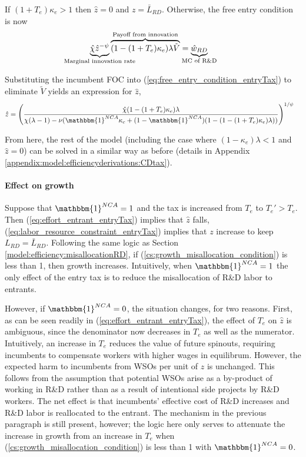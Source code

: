 \documentclass[11pt,english]{article}
\theoremstyle{definition}
\begin{document}
If $(1 + T_e) \kappa_e > 1$ then $\hat{z} = 0$ and $z = \bar{L}_{RD}$. Otherwise, the free entry condition is now
\begin{align}
\underbrace{\hat{\chi} \hat{z}^{-\psi}}_{\mathclap{\text{Marginal innovation rate}}} \overbrace{(1-(1+T_e)\kappa_e) \lambda \tilde{V}}^{\mathclap{\text{Payoff from innovation}}} &= \underbrace{\hat{w}_{RD}}_{\mathclap{\text{MC of R\&D}}} \label{eq:free_entry_condition_entryTax}
\end{align}

Substituting the incumbent FOC into (\ref{eq:free_entry_condition_entryTax}) to eliminate $\tilde{V}$ yields an expression for $\hat{z}$, 
\begin{align}
\hat{z} &= \Bigg( \frac{\hat{\chi} (1-(1+T_e)\kappa_{e}) \lambda}{\chi(\lambda -1) - \nu (\mathbbm{1}^{NCA}\kappa_c + (1-\mathbbm{1}^{NCA})(1 - (1-(1+T_e)\kappa_e)\lambda)) } \Bigg)^{1/\psi} \label{eq:effort_entrant_entryTax}
\end{align}

From here, the rest of the model (including the case where $(1-\kappa_e)\lambda < 1$ and $\hat{z} = 0$) can be solved in a similar way as before (details in Appendix \ref{appendix:model:efficiencyderivations:CDtax}). 

\paragraph{Effect on growth}

Suppose that $\mathbbm{1}^{NCA} = 1$ and the tax is increased from $T_e$ to $T_e' > T_e$. Then (\ref{eq:effort_entrant_entryTax}) implies that $\hat{z}$ falls, (\ref{eq:labor_resource_constraint_entryTax}) implies that $z$ increase to keep $L_{RD} = \bar{L}_{RD}$. Following the same logic as Section \ref{model:efficiency:misallocationRD}, if (\ref{cs:growth_misallocation_condition}) is less than 1, then growth increases. Intuitively, when $\mathbbm{1}^{NCA} = 1$ the only effect of the entry tax is to reduce the misallocation of R\&D labor to entrants. 

However, if $\mathbbm{1}^{NCA} = 0$, the situation changes, for two reasons. First, as can be seen readily in (\ref{eq:effort_entrant_entryTax}), the effect of $T_e$ on $\hat{z}$ is ambiguous, since the denominator now decreases in $T_e$ as well as the numerator. Intuitively, an increase in $T_e$ reduces the value of future spinouts, requiring incumbents to compensate workers with higher wages in equilibrum. However, the expected harm to incumbents from WSOs per unit of $z$ is unchanged. This follows from the assumption that potential WSOs arise as a by-product of working in R\&D rather than as a result of intentional side projects by R\&D workers. The net effect is that incumbents' effective cost of R\&D increases and R\&D labor is reallocated to the entrant. The mechanism in the previous paragraph is still present, however; the logic here only serves to attenuate the increase in growth from an increase in $T_e$ when (\ref{cs:growth_misallocation_condition}) is less than 1 with $\mathbbm{1}^{NCA} = 0$.
\end{document}
